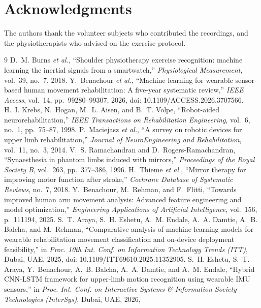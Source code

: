 \documentclass[conference]{IEEEtran}
\begin{document}
\section*{Acknowledgments}
The authors thank the volunteer subjects who contributed the
recordings, and the physiotherapists who advised on the exercise
protocol.

\begin{thebibliography}{9}
 D.~M. Burns \emph{et al.}, ``Shoulder
physiotherapy exercise recognition: machine learning the inertial
signals from a smartwatch,'' \emph{Physiological Measurement},
vol.~39, no.~7, 2018.
 Y.~Benachour \emph{et al.}, ``Machine
learning for wearable sensor-based human movement rehabilitation: A
five-year systematic review,'' \emph{IEEE Access}, vol.~14,
pp.~99280--99307, 2026, doi: 10.1109/ACCESS.2026.3707566.
 H.~I. Krebs, N.~Hogan, M.~L. Aisen, and
B.~T. Volpe, ``Robot-aided neurorehabilitation,'' \emph{IEEE
Transactions on Rehabilitation Engineering}, vol.~6, no.~1,
pp.~75--87, 1998.
 P.~Maciejasz \emph{et al.}, ``A survey on
robotic devices for upper limb rehabilitation,'' \emph{Journal of
NeuroEngineering and Rehabilitation}, vol.~11, no.~3, 2014.
 V.~S. Ramachandran and D.~Rogers-Ramachandran,
``Synaesthesia in phantom limbs induced with mirrors,''
\emph{Proceedings of the Royal Society B}, vol.~263, pp.~377--386, 1996.
 H.~Thieme \emph{et al.}, ``Mirror therapy for
improving motor function after stroke,'' \emph{Cochrane Database of
Systematic Reviews}, no.~7, 2018.
 Y.~Benachour, M.~Rehman, and F.~Flitti,
``Towards improved human arm movement analysis: Advanced feature
engineering and model optimization,'' \emph{Engineering Applications
of Artificial Intelligence}, vol.~156, p.~111194, 2025.
 S.~T. Araya, S.~H. Eshetu, A.~M. Endale,
A.~A. Damtie, A.~B. Balcha, and M.~Rehman, ``Comparative analysis of
machine learning models for wearable rehabilitation movement
classification and on-device deployment feasibility,'' in \emph{Proc.
10th Int. Conf. on Information Technology Trends (ITT)}, Dubai, UAE,
2025, doi: 10.1109/ITT69610.2025.11352905.
 S.~H. Eshetu, S.~T. Araya, Y.~Benachour,
A.~B. Balcha, A.~A. Damtie, and A.~M. Endale, ``Hybrid CNN-LSTM
framework for upper-limb motion recognition using wearable IMU
sensors,'' in \emph{Proc. Int. Conf. on Interactive Systems \&
Information Society Technologies (InterSys)}, Dubai, UAE, 2026,

\end{thebibliography}
\end{document}
